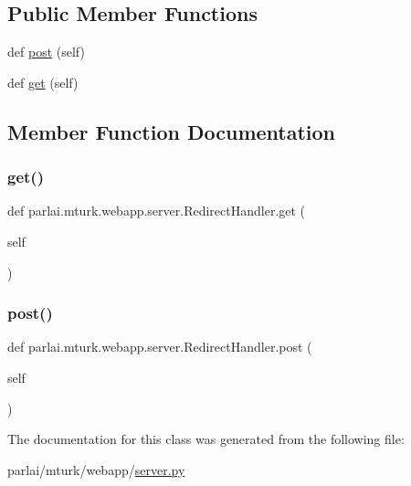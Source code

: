 \subsection*{Public Member Functions}
\begin{DoxyCompactItemize}
\item 
def \hyperlink{classparlai_1_1mturk_1_1webapp_1_1server_1_1RedirectHandler_a1b5e6edf88df4e60433ec3a8244773b6}{post} (self)
\item 
def \hyperlink{classparlai_1_1mturk_1_1webapp_1_1server_1_1RedirectHandler_a8257f43e09aae52e61eae8357db5b6ad}{get} (self)
\end{DoxyCompactItemize}


\subsection{Member Function Documentation}
\mbox{\label{classparlai_1_1mturk_1_1webapp_1_1server_1_1RedirectHandler_a8257f43e09aae52e61eae8357db5b6ad}} 
\subsubsection{\texorpdfstring{get()}{get()}}
{\footnotesize\ttfamily def parlai.\+mturk.\+webapp.\+server.\+Redirect\+Handler.\+get (\begin{DoxyParamCaption}\item[{}]{self }\end{DoxyParamCaption})}

\mbox{\label{classparlai_1_1mturk_1_1webapp_1_1server_1_1RedirectHandler_a1b5e6edf88df4e60433ec3a8244773b6}} 
\subsubsection{\texorpdfstring{post()}{post()}}
{\footnotesize\ttfamily def parlai.\+mturk.\+webapp.\+server.\+Redirect\+Handler.\+post (\begin{DoxyParamCaption}\item[{}]{self }\end{DoxyParamCaption})}



The documentation for this class was generated from the following file\+:\begin{DoxyCompactItemize}
\item 
parlai/mturk/webapp/\hyperlink{server_8py}{server.\+py}\end{DoxyCompactItemize}
